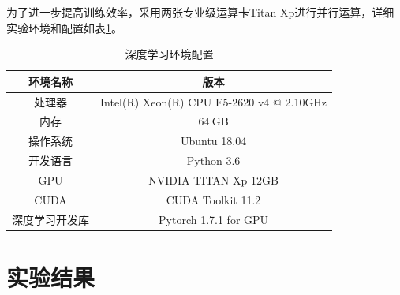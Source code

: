 为了进一步提高训练效率，采用两张专业级运算卡Titan Xp进行并行运算，详细实验环境和配置如表\ref{tab:env_para}。
\begin{table}
	\caption{\label{tab:env_para}深度学习环境配置}
	\centering
	\small
	\begin{tabular}{cc}
		\hline 环境名称 & 版本 \\
		\hline 处理器 & Intel(R) Xeon(R) CPU E5-2620 v4 @ 2.10GHz \\
		内存 & $64 \mathrm{~GB}$ \\
		操作系统 & Ubuntu 18.04 \\
		开发语言 & Python 3.6 \\
		GPU & NVIDIA TITAN Xp 12GB \\
		CUDA & CUDA Toolkit 11.2 \\
		深度学习开发库 & Pytorch 1.7.1 for GPU \\
		\hline
		\end{tabular}
\end{table}

\section{实验结果}
